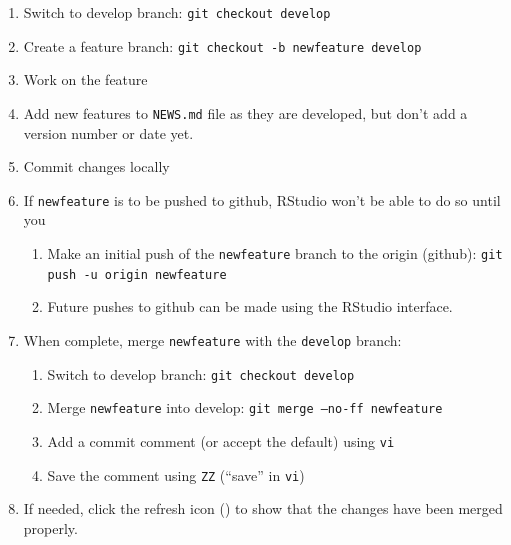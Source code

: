 \documentclass{article}
\begin{document}
\begin{enumerate}

  \item Switch to develop branch: \texttt{git checkout develop}

  \item Create a feature branch: \texttt{git checkout -b newfeature develop}

  \item Work on the feature

  \item Add new features to \texttt{NEWS.md} file as they are developed, but
        don't add a version number or date yet.

  \item Commit changes locally

  \item If \texttt{newfeature} is to be pushed to github, RStudio won't be able to do so until you
  \begin{enumerate}

    \item Make an initial push of the \texttt{newfeature} branch
	      to the origin (github):
		  \texttt{git push -u origin newfeature}

	\item Future pushes to github can be made using the RStudio interface.

  \end{enumerate}
  \item When complete, merge \texttt{newfeature} with the \texttt{develop} branch:
  \begin{enumerate}

    \item Switch to develop branch: \texttt{git checkout develop}

    \item Merge \texttt{newfeature} into develop: \texttt{git merge --no-ff newfeature}

	\item Add a commit comment (or accept the default) using \texttt{vi}

	\item Save the comment using \texttt{ZZ} (``save'' in \texttt{vi})

  \end{enumerate}
  \item If needed, click the refresh icon
		() to show that the
		changes have been merged properly.


\end{enumerate}
\end{document}
